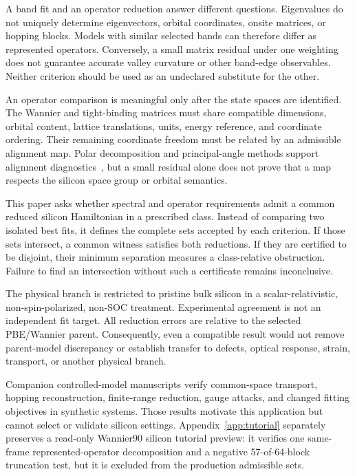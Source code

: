 \documentclass[11pt]{article}
\begin{document}
A band fit and an operator reduction answer different questions. Eigenvalues do not uniquely determine eigenvectors, orbital coordinates, onsite matrices, or hopping blocks. Models with similar selected bands can therefore differ as represented operators. Conversely, a small matrix residual under one weighting does not guarantee accurate valley curvature or other band-edge observables. Neither criterion should be used as an undeclared substitute for the other.

An operator comparison is meaningful only after the state spaces are identified. The Wannier and tight-binding matrices must share compatible dimensions, orbital content, lattice translations, units, energy reference, and coordinate ordering. Their remaining coordinate freedom must be related by an admissible alignment map. Polar decomposition and principal-angle methods support alignment diagnostics~\cite{bjorck1973,higham1986}, but a small residual alone does not prove that a map respects the silicon space group or orbital semantics.

This paper asks whether spectral and operator requirements admit a common reduced silicon Hamiltonian in a prescribed class. Instead of comparing two isolated best fits, it defines the complete sets accepted by each criterion. If those sets intersect, a common witness satisfies both reductions. If they are certified to be disjoint, their minimum separation measures a class-relative obstruction. Failure to find an intersection without such a certificate remains inconclusive.

The physical branch is restricted to pristine bulk silicon in a scalar-relativistic, non-spin-polarized, non-SOC treatment. Experimental agreement is not an independent fit target. All reduction errors are relative to the selected PBE/Wannier parent. Consequently, even a compatible result would not remove parent-model discrepancy or establish transfer to defects, optical response, strain, transport, or another physical branch.

Companion controlled-model manuscripts verify common-space transport, hopping
reconstruction, finite-range reduction, gauge attacks, and changed fitting objectives
in synthetic systems. Those results motivate this application but cannot select or
validate silicon settings. Appendix~\ref{app:tutorial} separately preserves a read-only
Wannier90 silicon tutorial preview: it verifies one same-frame represented-operator
decomposition and a negative 57-of-64-block truncation test, but it is excluded from the
production admissible sets.
\end{document}
